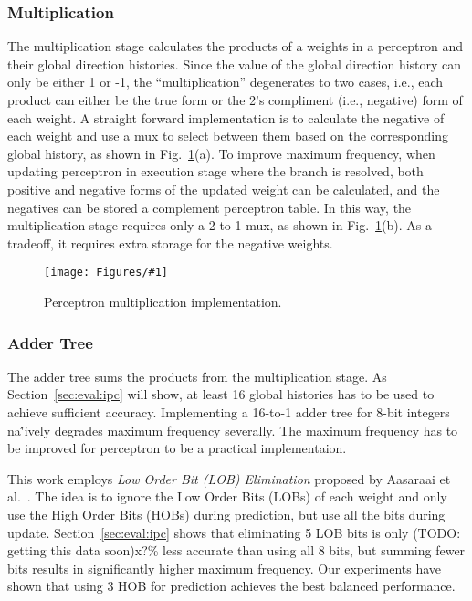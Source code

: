 \documentclass[conference]{IEEEtran}
\newcommand{\kfig}[4]{ %
        \begin{figure}[!t]
        \centering
        \texttt{[image: Figures/\#1]}
        \vspace{-1mm}
        \caption{#3}
        \label{#2}
        \end{figure}
}
\begin{document}
\subsubsection{Multiplication}
\label{sec:fpga:perceptron:mult}
The multiplication stage calculates the products of a weights in a perceptron and their global direction histories. Since the value of the global direction history can only be either 1 or -1, the ``multiplication'' degenerates to two cases, i.e., each product can either be the true form or the 2's compliment (i.e., negative) form of each weight. A straight forward implementation is to calculate the negative of each weight and use a mux to select between them based on the corresponding global history, as shown in Fig.~\ref{fig:perceptronMult}(a). To improve maximum frequency, when updating perceptron in execution stage where the branch is resolved, both positive and negative forms of the updated weight can be calculated, and the negatives can be stored a complement perceptron table. In this way, the multiplication stage requires only a 2-to-1 mux, as shown in Fig.~\ref{fig:perceptronMult}(b). As a tradeoff, it requires extra storage for the negative weights.
\kfig{perceptronMult.pdf}{fig:perceptronMult}{Perceptron multiplication implementation.}{angle = 0, trim = 0.3in 2in 3in 0.6in, clip, width=0.4\textwidth}

\subsubsection{Adder Tree}
\label{sec:fpga:perceptron:adder}
The adder tree sums the products from the multiplication stage. As Section~\ref{sec:eval:ipc} will show, at least 16 global histories has to be used to achieve sufficient accuracy. Implementing a 16-to-1 adder tree for 8-bit integers na\''ively degrades maximum frequency severally. The maximum frequency has to be improved for perceptron to be a practical implementaion.

This work employs \textit{Low Order Bit (LOB) Elimination} proposed by Aasaraai et al.~\cite{lob}. The idea is to ignore the Low Order Bits (LOBs) of each weight and only use the High Order Bits (HOBs) during prediction, but use all the bits during update. Section~\ref{sec:eval:ipc} shows that eliminating 5 LOB bits is only (TODO: getting this data soon)x?\% less accurate than using all 8 bits, but summing fewer bits results in significantly higher maximum frequency. Our experiments have shown that using 3 HOB for prediction achieves the best balanced performance.
\end{document}
